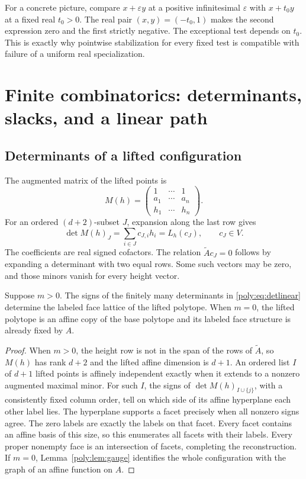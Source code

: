 \documentclass[11pt,a4paper]{article}
\numberwithin{equation}{section}
\theoremstyle{plain}
\newcommand{\eps}{\varepsilon}
\newcommand{\Atil}{\widetilde A}
\begin{document}
For a concrete picture, compare $x+\eps y$ at a positive infinitesimal
$\eps$ with $x+t_0y$ at a fixed real $t_0>0$. The real pair
$(x,y)=(-t_0,1)$ makes the second expression zero and the first strictly
negative. The exceptional test depends on $t_0$. This is exactly why
pointwise stabilization for every fixed test is compatible with failure of
a uniform real specialization.

\section{Finite combinatorics: determinants, slacks, and a linear path}
\label{poly:sec:finite}

\subsection{Determinants of a lifted configuration}

The augmented matrix of the lifted points is
\[
 M(h)=\begin{pmatrix}1&\cdots&1\\ a_1&\cdots&a_n\\h_1&\cdots&h_n\end{pmatrix}.
\]
For an ordered $(d+2)$-subset $J$, expansion along the last row gives
\begin{equation}\label{poly:eq:detlinear}
 \det M(h)_J=\sum_{i\in J}c_{J,i}h_i=L_h(c_J),
 \qquad c_J\in V.
\end{equation}
The coefficients are real signed cofactors. The relation $\Atil c_J=0$
follows by expanding a determinant with two equal rows. Some such vectors
may be zero, and those minors vanish for every height vector.

\begin{lemma}
\label{poly:lem:faces}
Suppose $m>0$. The signs of the finitely many determinants in
\eqref{poly:eq:detlinear} determine the labeled face lattice of the lifted
polytope. When $m=0$, the lifted polytope is an affine copy of the base
polytope and its labeled face structure is already fixed by $A$.
\end{lemma}
\begin{proof}
When $m>0$, the height row is not in the span of the rows of $\Atil$,
so $M(h)$ has rank $d+2$ and the lifted affine dimension is $d+1$.
An ordered list $I$ of $d+1$ lifted points is affinely independent exactly
when it extends to a nonzero augmented maximal minor. For such $I$, the
signs of $\det M(h)_{I\cup\{j\}}$, with a consistently fixed column
order, tell on which side of its affine hyperplane each other label lies.
The hyperplane supports a facet precisely when all nonzero signs agree.
The zero labels are exactly the labels on that facet. Every facet contains
an affine basis of this size, so this enumerates all facets with their
labels. Every proper nonempty face is an intersection of facets, completing
the reconstruction. If $m=0$, Lemma~\ref{poly:lem:gauge} identifies the whole
configuration with the graph of an affine function on $A$.
\end{proof}
\end{document}
